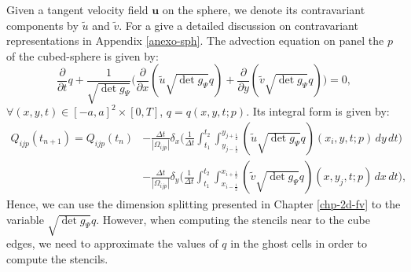 Given a tangent velocity field $\boldsymbol{u}$ on the sphere, we denote its
contravariant components by $\tilde{u}$ and $\tilde{v}$.
For a give a detailed discussion on contravariant representations in Appendix \ref{anexo-sph}.
The advection equation on panel the $p$ of the cubed-sphere is given by:
\begin{equation*}
	\frac{\partial}{\partial t}{q}+
	\frac{1}{\sqrt{\det{g_{\Psi}}}}\bigg(
	\frac{\partial}{\partial x} {(\tilde{u}\sqrt{\det{g_{\Psi}}}q)}+
	\frac{\partial}{\partial y} {(\tilde{v}\sqrt{\det{g_{\Psi}}}q)}
	\bigg)
	= 0,
\end{equation*}
$\forall (x,y,t) \in [-a,a]^2\times[0,T]$, $q = {q}(x,y,t;p)$.
Its integral form is given by:
\begin{align*}
	{Q}_{ijp}(t_{n+1})  = {Q}_{ijp}(t_{n})
	&- \frac{\Delta t}{|\Omega_{ijp}|}
	\delta _x \bigg( \frac{1}{\Delta t}
	\int_{t_1}^{t_2} \int_{y_{j-\frac{1}{2}}}^{y_{j+\frac{1}{2}}}
	{(\tilde{u}\sqrt{\det{g_{\Psi}}}q)}(x_{i}, y, t;p)
	\,dy \,dt \bigg) \\ \nonumber
	&- \frac{\Delta t}{|\Omega_{ijp}|}
	\delta _y \bigg( \frac{1}{\Delta t}
	\int_{t_1}^{t_2} \int_{x_{i-\frac{1}{2}}}^{x_{i+\frac{1}{2}}}
	{(\tilde{v}\sqrt{\det{g_{\Psi}}}q)}(x, y_{j}, t;p)
	\,dx \,dt \bigg),
\end{align*}
Hence, we can use the dimension splitting presented in Chapter \ref{chp-2d-fv}
to the variable $\sqrt{\det{g_{\Psi}}}q$.
However, when computing the stencils near to the cube edges,
we need to approximate the values of $q$ in the ghost cells in order to compute
the stencils.
